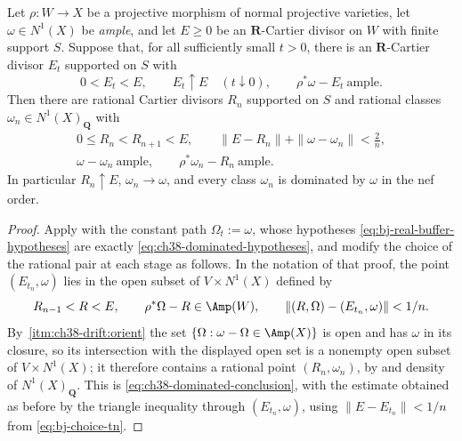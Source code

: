 \begin{lemma}
\label{lem:ch38-ordered-rational-dominated}
Let $\rho:W\to X$ be a projective morphism of normal projective
varieties, let $\omega\in N^1(X)$ be \emph{ample}, and let
$E\geq0$ be an $\mathbf R$-Cartier divisor on $W$ with finite
support $S$.  Suppose that, for all sufficiently small $t>0$, there is
an $\mathbf R$-Cartier divisor $E_t$ supported on $S$ with
\[
 0<E_t<E,\qquad
 E_t\uparrow E\quad(t\downarrow0),\qquad
 \rho^*\omega-E_t\ \text{ample}.
\tag{38.25}\label{eq:ch38-dominated-hypotheses}
\]
Then there are rational Cartier divisors $R_n$ supported on $S$ and
rational classes $\omega_n\in N^1(X)_{\mathbf Q}$ with
\[
 \begin{gathered}
 0\leq R_n<R_{n+1}<E,\qquad
 \|E-R_n\|+\|\omega-\omega_n\|<\tfrac2n,\\
 \omega-\omega_n\ \text{ample},\qquad
 \rho^*\omega_n-R_n\ \text{ample}.
 \end{gathered}
\tag{38.26}\label{eq:ch38-dominated-conclusion}
\]
In particular $R_n\uparrow E$, $\omega_n\to\omega$, and every class
$\omega_n$ is dominated by $\omega$ in the nef order.
\end{lemma}

\begin{proof}
Apply  with the constant path
$\Omega_t:=\omega$, whose hypotheses \eqref{eq:bj-real-buffer-hypotheses}
are exactly \eqref{eq:ch38-dominated-hypotheses}, and modify the choice of
the rational pair at each stage as follows.  In the notation of that proof,
the point $(E_{t_n},\omega)$ lies in the open subset of
$V\times N^1(X)$ defined by
\[
 R_{n-1}<R<E,\qquad
 \rho^*\Omega-R\in\Amp(W),\qquad
 \|(R,\Omega)-(E_{t_n},\omega)\|<1/n .
\]
By \,\cref{itm:ch38-drift:orient} the set
$\{\Omega:\omega-\Omega\in\Amp(X)\}$ is open and has $\omega$ in its
closure, so its intersection with the displayed open set is a nonempty
open subset of $V\times N^1(X)$; it therefore contains a rational point
$(R_n,\omega_n)$, by  and density
of $N^1(X)_{\mathbf Q}$.  This is
\eqref{eq:ch38-dominated-conclusion}, with the estimate obtained as before
by the triangle inequality through $(E_{t_n},\omega)$, using
$\|E-E_{t_n}\|<1/n$ from \eqref{eq:bj-choice-tn}.
\end{proof}


